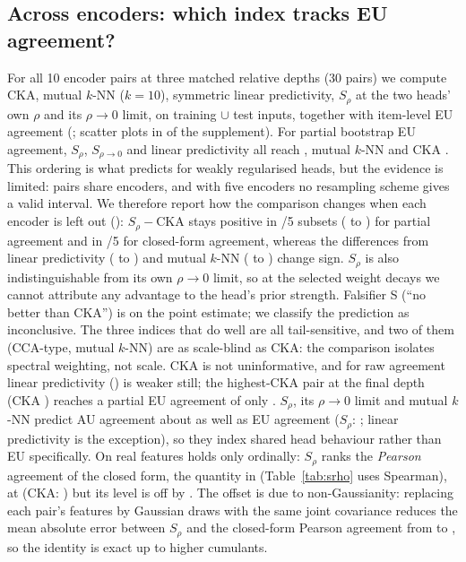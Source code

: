 \documentclass[twoside]{article}
\theoremstyle{definition}
\theoremstyle{remark}
\newcommand{\Srho}{S_{\rho}}
\begin{document}
\subsection{Across encoders: which index tracks EU agreement?}
\label{sec:srho}

For all 10 encoder pairs at three matched relative depths (30 pairs) we compute CKA, mutual $k$-NN ($k=10$), symmetric linear predictivity, $\Srho$ at the two heads' own $\rho$ and its $\rho\to0$ limit, on training $\cup$ test inputs, together with item-level EU agreement (; scatter plots in  of the supplement).
For partial bootstrap EU agreement, $\Srho$, $S_{\rho\to0}$ and linear predictivity all reach \SrhoVsEUwidthPartial{}, mutual $k$-NN \MKNNVsEUwidthPartial{} and CKA \CKAVsEUwidthPartial{}.
This ordering is what  predicts for weakly regularised heads, but the evidence is limited: pairs share encoders, and with five encoders no resampling scheme gives a valid interval. We therefore report how the comparison changes when each encoder is left out (): $\Srho-\mathrm{CKA}$ stays positive in \LOEOdiffCKApos{}/5 subsets (\LOEOdiffCKAmin{} to \LOEOdiffCKAmax{}) for partial agreement and in \LOEOdiffCKAblrPos{}/5 for closed-form agreement, whereas the differences from linear predictivity (\LOEOdiffLinMin{} to \LOEOdiffLinMax{}) and mutual $k$-NN (\LOEOdiffMknnMin{} to \LOEOdiffMknnMax{}) change sign.
$\Srho$ is also indistinguishable from its own $\rho\to0$ limit, so at the selected weight decays we cannot attribute any advantage to the head's prior strength.
Falsifier S (``no better than CKA'') is \SrhoFals{} on the point estimate; we classify the prediction as inconclusive.
The three indices that do well are all tail-sensitive, and two of them (CCA-type, mutual $k$-NN) are as scale-blind as CKA: the comparison isolates spectral weighting, not scale.
CKA is not uninformative, and for raw agreement linear predictivity (\LinVsEUwidth{}) is weaker still; the highest-CKA pair at the final depth (CKA \EfourCKA{}) reaches a partial EU agreement of only \HighCKAPartial{}.
$\Srho$, its $\rho\to0$ limit and mutual $k$-NN predict AU agreement about as well as EU agreement ($\Srho$: \SrhoVsAU{}; linear predictivity is the exception), so they index shared head behaviour rather than EU specifically.
On real features  holds only ordinally: $\Srho$ ranks the \emph{Pearson} agreement of the closed form, the quantity in  (Table~\ref{tab:srho} uses Spearman), at \RealThmRank{} (CKA: \RealThmRankCKA{}) but its level is off by \RealThmMAE{}. The offset is due to non-Gaussianity: replacing each pair's features by Gaussian draws with the same joint covariance reduces the mean absolute error between $\Srho$ and the closed-form Pearson agreement from \GaussMAEreal{} to \GaussMAEgauss{}, so the identity is exact up to higher cumulants.
\end{document}
